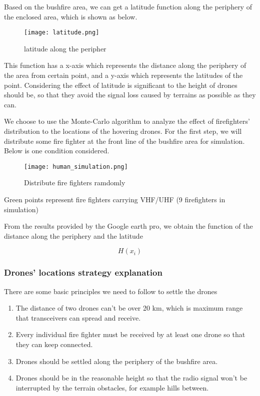 \documentclass[../main]{subfiles}
\begin{document}
Based on the bushfire area, we can get a latitude function along the
periphery of the enclosed area, which is shown as below.
\begin{figure}[h!]
      \centering
      \captionsetup{justification=centering}
      \texttt{[image: latitude.png]}
      \caption{latitude along the peripher}
      \end{figure}
    
This function has a x-axis which represents the distance along the
periphery of the area from certain point, and a y-axis which represents
the latitudes of the point. Considering the effect of latitude is
significant to the height of drones should be, so that they avoid the
signal loss caused by terrains as possible as they can.

We choose to use the Monte-Carlo algorithm to analyze the effect of
firefighters' distribution to the locations of the hovering drones. For
the first step, we will distribute some fire fighter at the front line
of the bushfire area for simulation. Below is one condition considered.

\begin{figure}[h!]
      \centering
      \captionsetup{justification=centering}
      \texttt{[image: human\_simulation.png]}
      \caption{Distribute fire fighters ramdomly}
      \end{figure}
      
Green points represent fire fighters carrying VHF/UHF (9 firefighters in simulation)

From the results provided by the Google earth pro, we obtain the
function of the distance along the periphery and the latitude

\begin{equation}
H(x_i)
\end{equation}

\subsubsection{Drones' locations strategy explanation}

There are some basic principles we need to follow to settle the drones

\begin{enumerate}
\def\labelenumi{\arabic{enumi}.}
\item
  The distance of two drones can't be over 20 km, which is maximum range
  that transceivers can spread and receive.
\item
  Every individual fire fighter must be received by at least one drone
  so that they can keep connected.
\item
  Drones should be settled along the periphery of the bushfire area.
\item
  Drones should be in the reasonable height so that the radio signal
  won't be interrupted by the terrain obstacles, for example hills
  between.
\end{enumerate}
\end{document}
